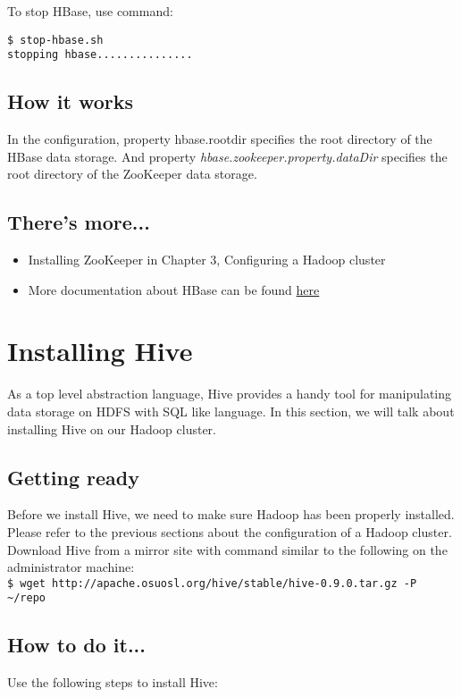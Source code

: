 To stop HBase, use command:
\begin{verbatim}
$ stop-hbase.sh
stopping hbase...............
\end{verbatim}

\subsection*{How it works}
In the configuration, property hbase.rootdir specifies the root directory of the HBase data storage. And property \emph{hbase.zookeeper.property.dataDir} specifies the root directory of the ZooKeeper data storage.

\subsection*{There's more...}
\begin{itemize}
  \item Installing ZooKeeper in Chapter 3, Configuring a Hadoop cluster
  \item More documentation about HBase can be found \href{http://wiki.apache.org/hadoop/Hbase}{here}
\end{itemize}

\section{Installing Hive}
As a top level abstraction language, Hive provides a handy tool for manipulating data storage on HDFS with SQL like language. In this section, we will talk about installing Hive on our Hadoop cluster.

\subsection*{Getting ready}
Before we install Hive, we need to make sure Hadoop has been properly installed. Please refer to the previous sections about the configuration of a Hadoop cluster. \\
Download Hive from a mirror site with command similar to the following on the administrator machine: \\
\verb|$ wget http://apache.osuosl.org/hive/stable/hive-0.9.0.tar.gz -P ~/repo|

\subsection*{How to do it...}
Use the following steps to install Hive:


